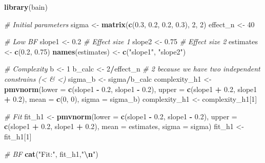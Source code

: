 \documentclass[
]{article}
\newenvironment{Shaded}{\begin{snugshade}}{\end{snugshade}}
\newcommand{\AttributeTok}[1]{\textcolor[rgb]{0.13,0.29,0.53}{#1}}
\newcommand{\CommentTok}[1]{\textcolor[rgb]{0.56,0.35,0.01}{\textit{#1}}}
\newcommand{\DecValTok}[1]{\textcolor[rgb]{0.00,0.00,0.81}{#1}}
\newcommand{\FloatTok}[1]{\textcolor[rgb]{0.00,0.00,0.81}{#1}}
\newcommand{\FunctionTok}[1]{\textcolor[rgb]{0.13,0.29,0.53}{\textbf{#1}}}
\newcommand{\NormalTok}[1]{#1}
\newcommand{\OtherTok}[1]{\textcolor[rgb]{0.56,0.35,0.01}{#1}}
\newcommand{\SpecialCharTok}[1]{\textcolor[rgb]{0.81,0.36,0.00}{\textbf{#1}}}
\newcommand{\StringTok}[1]{\textcolor[rgb]{0.31,0.60,0.02}{#1}}
\begin{document}
\begin{Shaded}
\begin{Highlighting}[]
\FunctionTok{library}\NormalTok{(bain)}

\CommentTok{\# Initial parameters}
\NormalTok{sigma }\OtherTok{\textless{}{-}} \FunctionTok{matrix}\NormalTok{(}\FunctionTok{c}\NormalTok{(}\FloatTok{0.3}\NormalTok{, }\FloatTok{0.2}\NormalTok{, }\FloatTok{0.2}\NormalTok{, }\FloatTok{0.3}\NormalTok{), }\DecValTok{2}\NormalTok{, }\DecValTok{2}\NormalTok{)}
\NormalTok{effect\_n }\OtherTok{\textless{}{-}} \DecValTok{40}

\CommentTok{\# Low BF}
\NormalTok{slope1 }\OtherTok{\textless{}{-}} \FloatTok{0.2} \CommentTok{\# Effect size 1}
\NormalTok{slope2 }\OtherTok{\textless{}{-}} \FloatTok{0.75} \CommentTok{\# Effect size 2}
\NormalTok{estimates }\OtherTok{\textless{}{-}} \FunctionTok{c}\NormalTok{(}\FloatTok{0.2}\NormalTok{, }\FloatTok{0.75}\NormalTok{)}
\FunctionTok{names}\NormalTok{(estimates) }\OtherTok{\textless{}{-}} \FunctionTok{c}\NormalTok{(}\StringTok{"slope1"}\NormalTok{, }\StringTok{"slope2"}\NormalTok{)}

\CommentTok{\# Complexity}
\NormalTok{b }\OtherTok{\textless{}{-}} \DecValTok{1}
\NormalTok{b\_calc }\OtherTok{\textless{}{-}} \DecValTok{2}\SpecialCharTok{/}\NormalTok{effect\_n }\CommentTok{\# 2 because we have two independent constrains (\textless{} \& \textless{})}
\NormalTok{sigma\_b }\OtherTok{\textless{}{-}}\NormalTok{ sigma}\SpecialCharTok{/}\NormalTok{b\_calc}
\NormalTok{complexity\_h1 }\OtherTok{\textless{}{-}} \FunctionTok{pmvnorm}\NormalTok{(}\AttributeTok{lower =} \FunctionTok{c}\NormalTok{(slope1 }\SpecialCharTok{{-}} \FloatTok{0.2}\NormalTok{, slope1 }\SpecialCharTok{{-}} \FloatTok{0.2}\NormalTok{), }\AttributeTok{upper =} \FunctionTok{c}\NormalTok{(slope1 }\SpecialCharTok{+} \FloatTok{0.2}\NormalTok{, slope1 }\SpecialCharTok{+} \FloatTok{0.2}\NormalTok{), }
                             \AttributeTok{mean =} \FunctionTok{c}\NormalTok{(}\DecValTok{0}\NormalTok{, }\DecValTok{0}\NormalTok{), }\AttributeTok{sigma =}\NormalTok{ sigma\_b)}
\NormalTok{complexity\_h1 }\OtherTok{\textless{}{-}}\NormalTok{ complexity\_h1[}\DecValTok{1}\NormalTok{]}

\CommentTok{\# Fit }
\NormalTok{fit\_h1 }\OtherTok{\textless{}{-}} \FunctionTok{pmvnorm}\NormalTok{(}\AttributeTok{lower =} \FunctionTok{c}\NormalTok{(slope1 }\SpecialCharTok{{-}} \FloatTok{0.2}\NormalTok{, slope1 }\SpecialCharTok{{-}} \FloatTok{0.2}\NormalTok{), }\AttributeTok{upper =} \FunctionTok{c}\NormalTok{(slope1 }\SpecialCharTok{+} \FloatTok{0.2}\NormalTok{, slope1 }\SpecialCharTok{+} \FloatTok{0.2}\NormalTok{), }
                  \AttributeTok{mean =}\NormalTok{ estimates, }\AttributeTok{sigma =}\NormalTok{ sigma)}
\NormalTok{fit\_h1 }\OtherTok{\textless{}{-}}\NormalTok{ fit\_h1[}\DecValTok{1}\NormalTok{]}

\CommentTok{\# BF}
\FunctionTok{cat}\NormalTok{(}\StringTok{"Fit:"}\NormalTok{, fit\_h1,}\StringTok{"}\SpecialCharTok{\textbackslash{}n}\StringTok{"}\NormalTok{)}
\end{Highlighting}
\end{Shaded}
\end{document}
